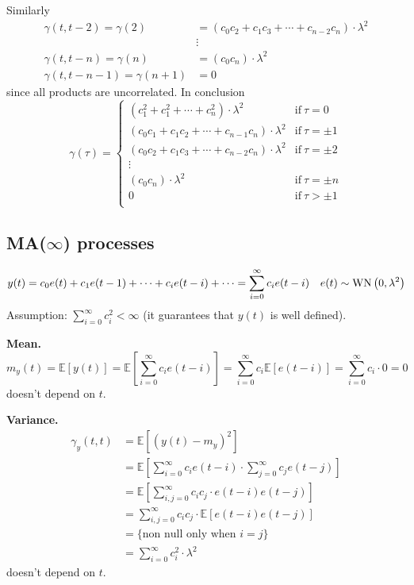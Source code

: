 Similarly
\begin{align*}
	\gamma (t,t-2)=\gamma (2) &= (c_{0}c_{2}+c_{1}c_{3}+\cdots+c_{n-2}c_{n})\cdot\lambda^2\\
	&\vdots\\
	\gamma (t,t-n)=\gamma (n) &= (c_{0}c_{n})\cdot\lambda^2\\
	\gamma (t,t-n-1)=\gamma (n+1) &= 0
\end{align*}
since all products are uncorrelated. In conclusion
\[
	\gamma (\tau )=\begin{cases}
		(c_{1}^2 +c_{1}^2 +\cdots+c_{n}^2 )\cdot\lambda^2 & \text{if}\ \tau =0\\
		(c_{0}c_{1}+c_{1}c_{2}+\cdots+c_{n-1}c_{n})\cdot\lambda^2 & \text{if}\ \tau =\pm 1\\
		(c_{0}c_{2}+c_{1}c_{3}+\cdots+c_{n-2}c_{n})\cdot\lambda^2 & \text{if}\ \tau =\pm 2\\
		\vdots\\
		(c_{0}c_{n})\cdot\lambda^2 & \text{if}\ \tau =\pm n\\
		0 & \text{if}\ \tau > \pm 1\\
	\end{cases}
\]
\subsection{MA(\texorpdfstring{$\infty$}{infinity}) processes}

\[
	y(t)=c_{0} e(t)+c_{1} e(t-1)+\cdots+c_{i} e(t-i)+\cdots=\sum_{i=0}^{\infty} c_{i} e(t-i) \quad e(t) \sim \operatorname{WN}\left(0, \lambda^{2}\right)
\]
Assumption: $\sum_{i=0}^{\infty} c_{i}^{2}<\infty$ (it guarantees that $y(t)$ is well defined).

\textbf{Mean.}
\[
	m_{y}(t)=\mathbb{E}[y(t)]=\mathbb{E}\left[\sum_{i=0}^{\infty} c_{i} e(t-i)\right]=\sum_{i=0}^{\infty} c_{i} \mathbb{E}[e(t-i)]=\sum_{i=0}^{\infty} c_{i} \cdot 0=0
\]
doesn't depend on $t$.

\textbf{Variance.}
\begin{align*}
	\gamma_{y}(t, t)&=\mathbb{E}[(y(t)-m_{y})^{2}]\\
	&=\mathbb{E}\left[\sum_{i=0}^{\infty} c_{i} e(t-i) \cdot \sum_{j=0}^{\infty} c_{j} e(t-j)\right]\\
	&=\mathbb{E}\left[\sum_{i, j=0}^{\infty} c_{i} c_{j} \cdot e(t-i) e(t-j)\right]\\
	&=\sum_{i, j=0}^{\infty} c_{i} c_{j} \cdot \mathbb{E}[e(t-i) e(t-j)]\\
	&=\{\text{non null only when }i=j\}\\
	&=\sum_{i=0}^{\infty} c_{i}^2 \cdot\lambda^2 
\end{align*}
doesn't depend on $t$.

